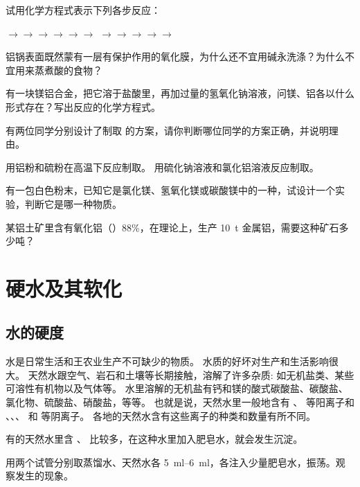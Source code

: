 \begin{Practice}[习题]
\begin{question}
  \item 试用化学方程式表示下列各步反应：
  \begin{tasks}
    \task {}$\to$$\to$$\to$$\to$$\to$$\to$
    \task {}$\to$$\to$$\to$$\to$$\to$
  \end{tasks}
  \item 铝锅表面既然蒙有一层有保护作用的氧化膜，为什么还不宜用碱永洗涤？为什么不宜用来蒸煮酸的食物？
  \item 有一块镁铝合金，把它溶于盐酸里，再加过量的氢氧化钠溶液，问镁、铝各以什么形式存在？写出反应的化学方程式。
  \item 有两位同学分别设计了制取  的方案，请你判断哪位同学的方案正确，并说明理由。
  \begin{tasks}
    \task 用铝粉和硫粉在高温下反应制取。
    \task 用硫化钠溶液和氯化铝溶液反应制取。
  \end{tasks}
  \item 有一包白色粉末，已知它是氯化镁、氢氧化镁或碳酸镁中的一种，试设计一个实验，判断它是哪一种物质。
  \item 某铝土矿里含有氧化铝（）88\%，在理论上，生产 \qty{10}{t} 金属铝，需要这种矿石多少吨？
\end{question}
\end{Practice}

\section{硬水及其软化}
\subsection{水的硬度}
水是日常生活和王农业生产不可缺少的物质。
水质的好坏对生产和生活影响很大。
天然水跟空气、岩石和土壤等长期接触，溶解了许多杂质: 如无机盐类、某些可溶性有机物以及气体等。
水里溶解的无机盐有钙和镁的酸式碳酸盐、碳酸盐、氯化物、硫酸盐、硝酸盐，等等。
也就是说，天然水里一般地含有 、 等阳离子和 、、、 和  等阴离子。
各地的天然水含有这些离子的种类和数量有所不同。

有的天然水里含 、 比较多，在这种水里加入肥皂水，就会发生沉淀。

\begin{Experiment}\label{expr:6-5}
  用两个试管分别取蒸馏水、天然水各 \qtyrange{5}{6}{ml}，各注入少量肥皂水，振荡。观察发生的现象。
\end{Experiment}

